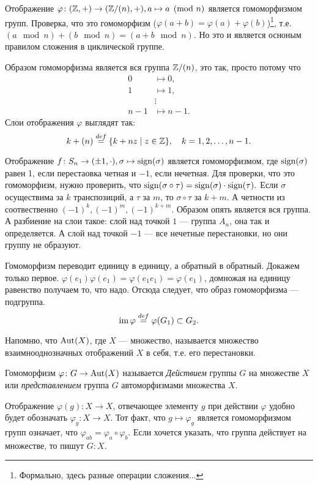 \begin{example}
    Отображение $\varphi \colon (\mathbb Z, +) \to (\mathbb Z/(n), +), a \mapsto a \pmod n$ является гомоморфизмом групп. Проверка, что это гомоморфизм ($\varphi(a+b) = \varphi(a) + \varphi(b)$)\footnote{Формально, здесь разные операции сложения...}, т.е. $(a \mod n) + (b \mod n) = (a+b \mod n)$. Но это и является осноным правилом сложения в циклической группе.

    Образом гомоморфизма является вся группа $\mathbb Z/(n)$, это так, просто потому что \[
        \begin{aligned}
            0 &\mapsto 0, \\
            1 &\mapsto 1, \\
              &\vdots \\
            n-1 &\mapsto n-1.
        \end{aligned}
    \]
    Слои отображения $\varphi$ выглядят так: $$k + (n) \overset{def}{=} \{k + nz\mid z \in \mathbb Z\}, \quad k = 1, 2, \ldots, n-1.$$
\end{example}
\begin{example}
    Отображение $f \colon S_n \to (\pm 1, \cdot), \sigma \mapsto  \operatorname{sign}(\sigma)$ является гомоморфизмом, где $\operatorname{sign}(\sigma)$ равен 1, если перестаовка четная и $-1$, если нечетная. Для проверки, что это гомоморфизм, нужно проверить, что $\operatorname{sign}(\sigma \circ \tau) = \operatorname{sign}(\sigma) \cdot \operatorname{sign}(\tau).$ Если $\sigma$ осуществима за $k$ транспозиций, а $\tau$ за $m$, то $\sigma \circ \tau$ за $k+m$. А четности из соотвественно $(-1)^k, (-1)^m, (-1)^{k+m}$.
    Образом опять является вся группа. А разбиение на слои такое: слой над точкой $1$ --- группа $A_n$, она так и определяется. А слой над точкой $-1$ --- все нечетные перестановки, но они группу не образуют.
\end{example}

Гомоморфизм переводит единицу в единицу, а обратный в обратный. Докажем только первое. \(\varphi(e_1)\varphi(e_1) = \varphi(e_1e_1)=\varphi(e_1)\), домножая на единицу равенство получаем то, что надо. Отсюда следует, что образ гомоморфизма --- подгруппа. \[\operatorname{im} \varphi \overset{def}{=} \varphi(G_1) \subset G_2.\]

Напомню, что $\operatorname{Aut}(X)$, где $X$ --- множество, называется множество взаимнооднозначных отображений $X$ в себя, т.е. его перестановки.

\begin{definition}
Гомоморфизм $\varphi\colon G \to \operatorname{Aut}(X)$ называется \emph{Действием} группы $G$ на множестве $X$ или \emph{представлением} группа $G$ автоморфизмами множества $X$. 

Отображение $\varphi(g) \colon X \to X$, отвечающее элементу $g$ при действии $\varphi$ удобно будет обозначать $\varphi_g \colon X \to X$. Тот факт, что $g \mapsto \varphi_g$ является гомоморфизмом групп означает, что $\varphi_{ab} = \varphi_a \circ \varphi_b$. Если хочется указать, что группа действует на множестве, то пишут $G \colon X$.
\end{definition}

